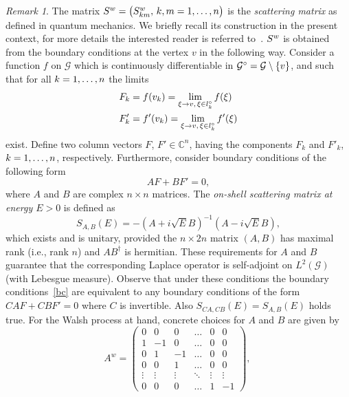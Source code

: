 \documentclass[11pt,a4paper]{amsart}
\newcommand{\cG}{\mathcal{G}}
\newcommand{\1}{1}
\newcommand{\C}{\mathbb{C}}
\theoremstyle{remark}
\newtheorem{remark}[theorem]{Remark}
\newcommand{\op}{\ensuremath^\circ}
\newcommand{\cGo}{\ensuremath\cG\op}
\newcommand{\kn}{\ensuremath k=1,\dotsc,n}
\newcommand{\SW}{\ensuremath S^w}
\numberwithin{equation}{section}
\begin{document}
\begin{remark}  \label{rem2.4}
The matrix $\SW=\bigl(\SW_{km},\,k,m = 1,\dotsc,n\bigr)$ is the \emph{scattering
matrix} as defined in quantum mechanics. We briefly recall its construction in the
present context, for more details the interested reader is referred
to~\cite{KoSc99}. $\SW$ is obtained from the boundary conditions at the vertex $v$
in the following way. Consider a function $f$ on $\cG$ which is continuously
differentiable in $\cGo=\cG\setminus\{v\}$, and such that for all $\kn$ the limits
\begin{align*}
    F_k  &= f(v_k) = \lim_{\xi\to v,\,\xi\in l_k\op} f(\xi)\\
    F'_k &= f'(v_k) = \lim_{\xi\to v,\,\xi\in l_k\op} f'(\xi)
\end{align*}
exist. Define two column vectors $F$, $F'\in\C^n$, having the components $F_k$ and
$F'_k$, $\kn$, respectively. Furthermore, consider boundary conditions of the following
form
\begin{equation}    \label{bc}
    A F + B F' =0,
\end{equation}
where $A$ and $B$ are complex $n\times n$ matrices. The \emph{on-shell scattering
matrix at energy $E>0$} is defined as
\begin{equation}    \label{SE}
    S_{A,B}(E) = - (A+i\sqrt{E}B)^{-1}(A-i\sqrt{E}B),
\end{equation}
which exists and is unitary, provided the $n\times 2n$ matrix $(A,B)$ has
maximal rank (i.e., rank $n$) and $AB^\dagger$ is hermitian. These requirements for $A$
and $B$ guarantee that the corresponding Laplace operator is self-adjoint
on $L^2(\cG)$ (with Lebesgue measure). Observe that under these conditions the
boundary conditions~\eqref{bc} are equivalent to any boundary conditions of the form
$CAF+CBF'=0$ where $C$ is invertible. Also $S_{CA, CB}(E) = S_{A,B}(E)$ holds true.
For the Walsh process at hand, concrete choices for $A$ and $B$ are given by
\begin{equation*}
    A^w=\begin{pmatrix}
            0&0&0&\ldots&0&0\\
            1&-1&0&\ldots&0&0\\
            0&1&-1&\ldots&0&0\\
            0&0&1&\ldots &0&0\\
            \vdots&\vdots&\vdots&\ddots&\vdots&\vdots\\
            0&0&0&\ldots&1&-1
        \end{pmatrix},\ %

\end{equation*}
\end{remark}
\end{document}
